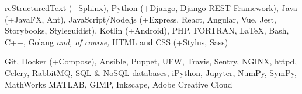 
\sectiondescription
{
reStructuredText (+Sphinx),
Python (+Django, Django REST Framework),
Java (+JavaFX, Ant),
JavaScript/Node.js (+Express, React, Angular, Vue, Jest, Storybooks, Styleguidist),
Kotlin (+Android),
PHP, FORTRAN, {\selectfont \LaTeX}, Bash, C++, Golang
\textit{and, of course,} HTML and CSS (+Stylus, Sass)
}

\sectiondescription
{
Git,
Docker (+Compose),
Ansible, Puppet, UFW,
Travis, Sentry,
NGINX, httpd, Celery, RabbitMQ, SQL \& NoSQL databases,
iPython, Jupyter, NumPy, SymPy, MathWorks MATLAB,
GIMP, Inkscape, Adobe Creative Cloud
}
